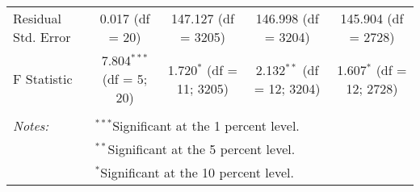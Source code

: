 \begin{table}[!htbp]
\begin{tabular}{@{\extracolsep{5pt}}lcccc}
Residual Std. Error & 0.017 (df = 20) & 147.127 (df = 3205) & 146.998 (df = 3204) & 145.904 (df = 2728) \\ 
F Statistic & 7.804$^{***}$ (df = 5; 20) & 1.720$^{*}$ (df = 11; 3205) & 2.132$^{**}$ (df = 12; 3204) & 1.607$^{*}$ (df = 12; 2728) \\ 
\hline \\[-1.8ex] 
\textit{Notes:} & \multicolumn{4}{l}{$^{***}$Significant at the 1 percent level.} \\ 
 & \multicolumn{4}{l}{$^{**}$Significant at the 5 percent level.} \\ 
 & \multicolumn{4}{l}{$^{*}$Significant at the 10 percent level.} \\ 
\end{tabular} 
\end{table} 
